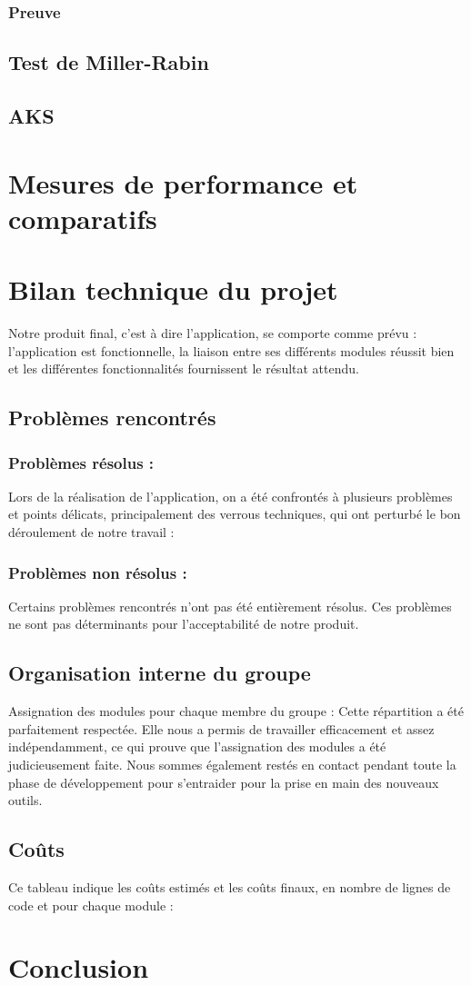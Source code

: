 			\subsubsection{Preuve}
		
		\subsection{Test de Miller-Rabin}
		
		\subsection{AKS}
		
	\section{Mesures de performance et comparatifs}
	
		
	\section{Bilan technique du projet}
		Notre produit final, c'est à dire l'application, se comporte comme prévu : l'application est fonctionnelle, la liaison entre ses différents modules réussit bien et les différentes fonctionnalités fournissent le résultat attendu.		

		\subsection{Problèmes rencontrés}
			\subsubsection*{Problèmes résolus :} 
			Lors de la réalisation de l'application, on a été confrontés à plusieurs problèmes et points délicats, principalement des verrous techniques, qui ont perturbé le bon déroulement de notre travail :
				
			\subsubsection*{Problèmes non résolus :}
				Certains problèmes rencontrés n'ont pas été entièrement résolus. Ces problèmes ne sont pas déterminants pour l'acceptabilité de notre produit.
				
		\subsection{Organisation interne du groupe}
		Assignation des modules pour chaque membre du groupe :
		Cette répartition a été parfaitement respectée. Elle nous a permis de travailler efficacement et assez indépendamment, ce qui prouve que l'assignation des modules a été judicieusement faite. Nous sommes également restés en contact pendant toute la phase de développement pour s'entraider pour la prise en main des nouveaux outils.
	
		\subsection{Coûts}
		Ce tableau indique les coûts estimés et les coûts finaux, en nombre de lignes de code et pour chaque module :
	
	\section*{Conclusion}
		

